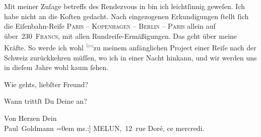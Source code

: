 \pstart
           Mit meiner Zuſage betreffs des Rendezvous in \label{K_L02777-3v}\label{K_L02777-3} bin ich leichtſinnig geweſen. Ich habe nicht an die Koſten gedacht. Nach
               eingezogenen Erkundigungen{ }ſtellt{ }ſich die Eiſenbahn-Reiſe \textsc{Paris – Kopenhagen – Berlin – Paris} allein {\pb}auf über 230 \textsc{Francs}, mit allen Rundreiſe-Ermäßigungen. Das geht über meine Kräfte. So
               werde ich wohl \substVorne{}\textsuperscript{\textcolor{gray}{lzu}}\substDazwischen{}zu\substHinten{} meinem anfänglichen Project einer Reiſe nach der Schweiz zurückkehren müſſen, wo ich in einer Nacht hinkann,
               und wir werden uns in dieſem Jahre wohl kaum{ }ſehen.\pend
           
\pstart
           Wie gehts, liebſter Freund?\pend
           
\pstart
           Wann trittſt Du Deine \label{K_L02777-4v}\label{K_L02777-4}
               an?\pend
           
\pstart
           Von Herzen Dein {\\[\baselineskip]}\spacefill\mbox{Paul Goldmann}\pend
           \leftskip=0em{}\vspace{1em}{\vspace{1\baselineskip}}
\pstart
           \raggedleft{}{\pb}{[}ms.:{]} MELUN, 12 rue Doré, ce mercredi.\pend
           
